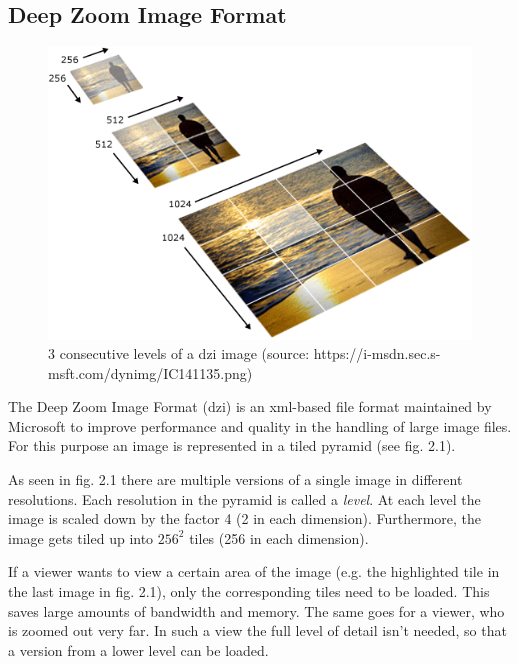 \subsection{Deep Zoom Image Format}

\begin{figure}[H]
	\begin{center}
		\includegraphics[scale=0.5]{img/dzi_pyramid.png}
		\caption{3 consecutive levels of a dzi image (source: https://i-msdn.sec.s-msft.com/dynimg/IC141135.png)}
		\label{fig:fig2.1}
	\end{center}
\end{figure}

The Deep Zoom Image Format (dzi) is an xml-based file format maintained by Microsoft to improve performance and quality in the handling of large image files. For this purpose an image is represented in a tiled pyramid (see fig. 2.1).

As seen in fig. 2.1 there are multiple versions of a single image in different resolutions. Each resolution in the pyramid is called a \emph{level}. At each level the image is scaled down by the factor 4 (2 in each dimension). Furthermore, the image gets tiled up into $256^2$ tiles (256 in each dimension)\cite{web:dzi}.

If a viewer wants to view a certain area of the image (e.g. the highlighted tile in the last image in fig. 2.1), only the corresponding tiles need to be loaded. This saves large amounts of bandwidth and memory. The same goes for a viewer, who is zoomed out very far. In such a view the full level of detail isn't needed, so that a version from a lower level can be loaded.

